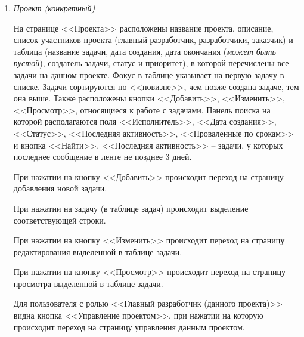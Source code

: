 \documentclass[14pt,a4paper]{extarticle}
\begin{document}
\begin{enumerate}
		\item {\it Проект (конкретный)}
		\par На странице <<Проекта>> расположены название проекта, описание, список участников проекта (главный разработчик, разработчики, заказчик) и таблица (название задачи, дата создания, дата окончания ({\it может быть пустой}), создатель задачи, статус и приоритет), в которой перечислены все задачи на данном проекте. Фокус в таблице указывает на первую задачу в списке. Задачи сортируются по <<новизне>>, чем позже создана задаче, тем она выше. Также расположены кнопки <<Добавить>>, <<Изменить>>, <<Просмотр>>, относящиеся к работе с задачами. Панель поиска на которой располагаются поля <<Исполнитель>>, <<Дата создания>>, <<Статус>>, <<Последняя активность>>, <<Проваленные по срокам>> и кнопка <<Найти>>. <<Последняя активность>> -- задачи, у которых последнее сообщение в ленте не позднее 3 дней.
		\par При нажатии на кнопку <<Добавить>> происходит переход на страницу добавления новой задачи.
		\par При нажатии на задачу (в таблице задач) происходит выделение соответствующей строки.
		\par При нажатии на кнопку <<Изменить>> происходит переход на страницу редактирования выделенной в таблице задачи.
		\par При нажатии на кнопку <<Просмотр>> происходит переход на страницу просмотра выделенной в таблице задачи.
		\par Для пользователя с ролью <<Главный разработчик (данного проекта)>> видна кнопка <<Управление проектом>>, при нажатии на которую происходит переход на страницу управления данным проектом.
		

\end{enumerate}
\end{document}
